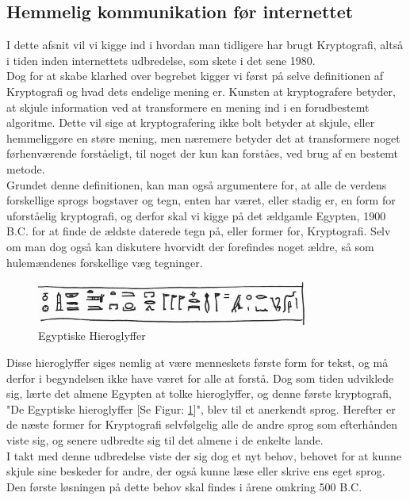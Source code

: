 \subsection{Hemmelig kommunikation før internettet}
I dette afsnit vil vi kigge ind i hvordan man tidligere har brugt Kryptografi, altså i tiden inden internettets udbredelse, som skete i det sene 1980. \\
Dog for at skabe klarhed over begrebet kigger vi først på selve definitionen af Kryptografi og hvad dets endelige mening er. 
Kunsten at kryptografere betyder, at skjule information ved at transformere en mening ind i en forudbestemt algoritme.
Dette vil sige at kryptografering ikke bolt betyder at skjule, eller hemmeliggøre en støre mening, men næremere betyder det at transformere noget førhenværende forståeligt, til noget der kun kan forståes, ved brug af en bestemt metode.\cite{MeningOfCryptography}\\
Grundet denne definitionen, kan man også argumentere for, at alle de verdens forskellige sprogs bogstaver og tegn, enten har været, eller stadig er, en form for uforståelig kryptografi, og derfor skal vi kigge på det ældgamle Egypten, 1900 B.C. for at finde de ældste daterede tegn på, eller former for, Kryptografi.\cite{PastCryptography} Selv om man dog også kan diskutere hvorvidt der forefindes noget ældre, så som hulemændenes forskellige væg tegninger.
\begin{figure}[H]
    \centering
    \includegraphics[width=0.8\textwidth, angle =0]{Projectdoc/Problemanalyse/Illustrationer/egypten.jpg}
    \caption{Egyptiske Hieroglyffer}
    \label{fig:hieroglyffer}
\end{figure}
\noindent
Disse hieroglyffer siges nemlig at være menneskets første form for tekst, og må derfor i begyndelsen ikke have været for alle at forstå. Dog som tiden udviklede sig, lærte det almene Egypten at tolke hieroglyffer, og denne første kryptografi, "De Egyptiske hieroglyffer [Se Figur: \ref{fig:hieroglyffer}]", blev til et anerkendt sprog.
Herefter er de næste former for Kryptografi selvfølgelig alle de andre sprog som efterhånden viste sig, og senere udbredte sig til det almene i de enkelte lande.\\
I takt med denne udbredelse viste der sig dog et nyt behov, behovet for at kunne skjule sine beskeder for andre, der også kunne læse eller skrive ens eget sprog. Den første løsningen på dette behov skal findes i årene omkring 500 B.C.\cite{PastCryptography} \\
